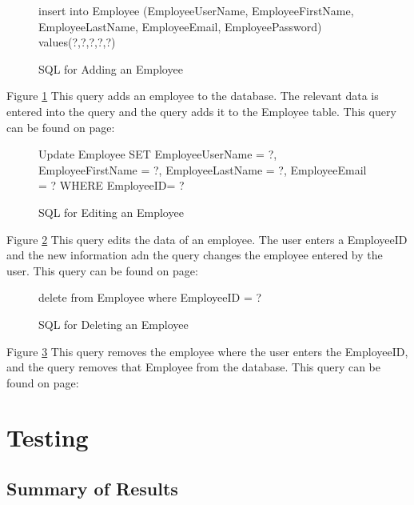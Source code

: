 \begin{figure}[H]
	 \caption{SQL for Adding an Employee} \label{fig:add-employee-sql}
\begin{sql}
insert into Employee (EmployeeUserName, EmployeeFirstName, EmployeeLastName, EmployeeEmail, EmployeePassword) values(?,?,?,?,?) 
\end{sql}
\end{figure}
Figure \ref{fig:add-employee-sql} This query adds an employee to the database. The relevant data is entered into the query and the query adds it to the Employee table. This query can be found on page:

\begin{figure}[H]
	 \caption{SQL for Editing an Employee} \label{fig:edit-employee-sql}
\begin{sql}
Update Employee SET EmployeeUserName = ?,
                                     EmployeeFirstName = ?,
                                     EmployeeLastName = ?,
                                     EmployeeEmail = ?
                                     WHERE EmployeeID= ?
                                     \end{sql}
\end{figure}
Figure \ref{fig:edit-employee-sql} This query edits the data of an employee. The user enters a EmployeeID and the new information adn the query changes the employee entered by the user. This query can be found on page: 

\begin{figure}[H]
	 \caption{SQL for Deleting an Employee} \label{fig:delete-employee-sql}
\begin{sql}
 delete from Employee where EmployeeID = ?
  \end{sql}
\end{figure}

Figure \ref{fig:delete-employee-sql} This query removes the employee where the user enters the EmployeeID, and the query removes that Employee from the database. This query can be found on page: 

\pagebreak 

\section{Testing}

\subsection{Summary of Results}

